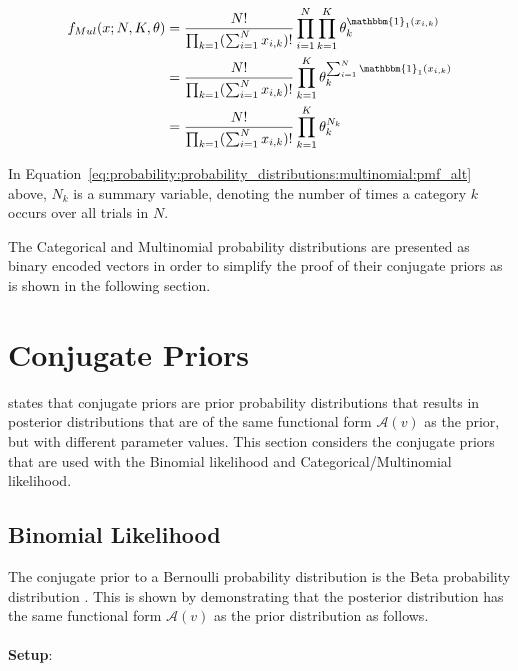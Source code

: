 \begin{equation}
      \label{eq:probability:probability_distributions:multinomial:pmf_alt}
      \begin{split}
            f_{Mul}(x; N, K, \theta) &= \frac{N!}{\prod_{k=1}(\sum_{i=1}^{N}x_{i, k})!}\prod_{i=1}^{N}\prod_{k=1}^{K}\theta_{k}^{\mathbbm{1}_{1}(x_{i,k})} \\
            &= \frac{N!}{\prod_{k=1}(\sum_{i=1}^{N}x_{i, k})!} \prod_{k=1}^{K}\theta_{k}^{\sum_{i=1}^{N}\mathbbm{1}_{1}(x_{i,k})} \\
            &= \frac{N!}{\prod_{k=1}(\sum_{i=1}^{N}x_{i, k})!} \prod_{k=1}^{K}\theta_{k}^{N_{k}} \\
      \end{split}
\end{equation}

In Equation~\eqref{eq:probability:probability_distributions:multinomial:pmf_alt} above, $N_{k}$ is a summary variable, denoting the number of times a category $k$ occurs over all trials in $N$.

The Categorical and Multinomial probability distributions are presented as binary encoded vectors in order to simplify the proof of their conjugate priors as is shown in the following section.


\section{Conjugate Priors}\label{sec:probability:conjugate_priors}

\citeauthor{ref:wackerly:2014}\cite{ref:wackerly:2014} states that conjugate priors are prior probability distributions that results in posterior distributions that are of the same functional form $\mathcal{A}(v)$ as the prior, but with different parameter values. This section considers the conjugate priors that are used with the Binomial likelihood and Categorical/Multinomial likelihood.

\subsection{Binomial Likelihood}\label{sec:probability:conjugate_priors:binom_likelihood}

The conjugate prior to a Bernoulli probability distribution is the Beta probability distribution
\cite{ref:wackerly:2014}. This is shown by demonstrating that the posterior distribution has the
same functional form $\mathcal{A}(v)$ as the prior distribution as follows. \\\\
\textbf{Setup}:

